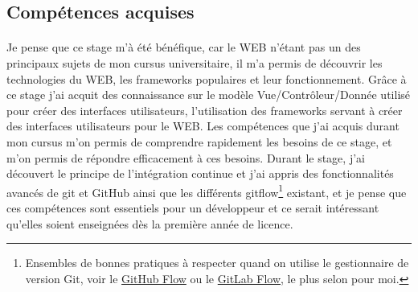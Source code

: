 \documentclass[11pt, a4paper, pdftex]{article}
\begin{document}
        \subsection{Compétences acquises}\label{subsec:compacq}
            \paragraph{}
                Je pense que ce stage m'à été bénéfique, car le WEB n'étant pas un des principaux sujets de mon cursus universitaire, il m'a permis de découvrir les technologies du WEB, les frameworks populaires et leur fonctionnement.
                Grâce à ce stage j'ai acquit des connaissance sur le modèle Vue/Contrôleur/Donnée utilisé pour créer des interfaces utilisateurs, l'utilisation des frameworks servant à créer des interfaces utilisateurs pour le WEB\@.
                Les compétences que j'ai acquis durant mon cursus m'on permis de comprendre rapidement les besoins de ce stage, et m'on permis de répondre efficacement à ces besoins.
                Durant le stage, j'ai découvert le principe de l'intégration continue et j'ai appris des fonctionnalités avancés de git et GitHub ainsi que les différents gitflow\footnote{Ensembles de bonnes pratiques à respecter quand on utilise le gestionnaire de version Git, voir le \href{https://guides.github.com/introduction/flow/}{GitHub Flow} ou le \href{https://about.gitlab.com/2014/09/29/gitlab-flow/}{GitLab Flow}, le plus selon pour moi.} existant,
                et je pense que ces compétences sont essentiels pour un développeur et ce serait intéressant qu'elles soient enseignées dès la première année de licence.

    \newpage

\end{document}
